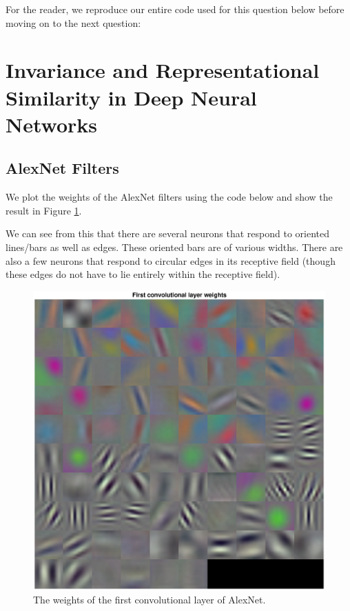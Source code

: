 \documentclass[11pt, oneside]{article}
\begin{document}
For the reader, we reproduce our entire code used for this question below before moving on to the next question:


\section{Invariance and Representational Similarity in Deep Neural Networks}

\subsection{AlexNet Filters}

We plot the weights of the AlexNet filters using the code below and show the result in Figure \ref{fig:AlexWeights}. 


We can see from this that there are several neurons that respond to oriented lines/bars as well as edges. These oriented bars are of various widths. There are also a few neurons that respond to circular edges in its receptive field (though these edges do not have to lie entirely within the receptive field). 

\begin{figure}[ht!]
\includegraphics[width=1\textwidth]{alex_weights.eps}
\caption{The weights of the first convolutional layer of AlexNet.}
\label{fig:AlexWeights}
\end{figure}
\end{document}
